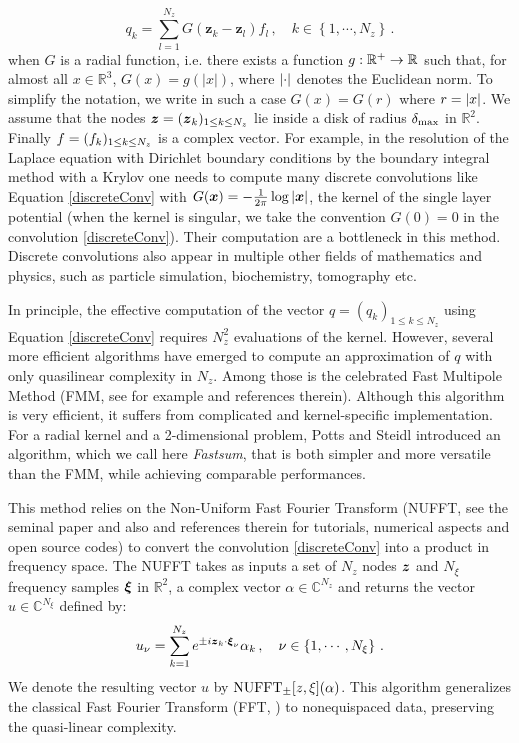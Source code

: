 \documentclass[smallextended]{svjour3}
\begin{document}
\begin{equation}
	q_k = \sum_{l = 1}^{N_z} G(\boldsymbol{z}_k - \boldsymbol{z}_l) f_l\,, \quad k \in \left\{1, \cdots, N_z\right\}\,.
	\label{discreteConv}					
\end{equation}
when $G$ is a radial function, i.e. there exists a function $g : \mathbb{R}^+ \to \mathbb{R}$ such that, for almost all $x \in \mathbb{R}^3$, $G(x) = g(|x|)$, where $\left\lvert \cdot \right\rvert$ denotes the Euclidean norm. To simplify the notation, we write in such a case $G(x) = G(r)$ where $r = \left\lvert x \right\rvert$. We assume that the nodes $\boldsymbol{z} = (\boldsymbol{z}_{k})_{1 \leq k \leq N_z}$ lie inside a disk of radius $\delta_{\max}$ in $\mathbb{R}^2$. Finally $f = (f_{k})_{1 \leq k \leq N_z}$ is a complex vector. For example, in the resolution of the Laplace equation with Dirichlet boundary conditions by the boundary integral method with a Krylov one needs to compute many discrete convolutions like Equation \eqref{discreteConv} with $G(\boldsymbol{x}) = -\frac{1}{2\pi}\log \left\lvert \boldsymbol{x} \right\rvert$, the kernel of the single layer potential (when the kernel is singular, we take the convention $G(0) = 0$ in the convolution \eqref{discreteConv}). Their computation are a bottleneck in this method. Discrete convolutions also appear in multiple other fields of mathematics and physics, such as particle simulation, biochemistry, tomography etc.

In principle, the effective computation of the vector $q = (q_k)_{1 \leq k\leq N_z}$ using Equation \eqref{discreteConv} requires $N_z^2$ evaluations of the kernel. However, several more efficient algorithms have emerged to compute an approximation of $q$ with only quasilinear complexity in $N_z$. Among those is the celebrated Fast Multipole Method (FMM, see for example \cite{greengard1988rapid,rokhlin1990rapid, rokhlin1993diagonal, coifman1993fast, cheng1999fast} and references therein). Although this algorithm is very efficient, it suffers from complicated and kernel-specific implementation. For a radial kernel and a 2-dimensional problem, Potts and Steidl \cite{potts2004fast} introduced an algorithm, which we call here \textit{Fastsum}, that is both simpler and more versatile than the FMM, while achieving comparable performances. 

This method relies on the Non-Uniform Fast Fourier Transform (NUFFT, see the seminal paper \cite{NuFFT} and also \cite{greengard2004accelerating,poplau2006calculation,keiner2009using,potts2001fast} and references therein for tutorials, numerical aspects and open source codes) to convert the convolution \eqref{discreteConv} into a product in frequency space. The NUFFT takes as inputs a set of $N_z$ nodes $\boldsymbol{z}$ and $N_\xi$ frequency samples $\boldsymbol{\xi}$ in $\mathbb{R}^2$, a complex vector $\alpha  \in \mathbb{C}^{N_z}$ and returns the vector  $u \in \mathbb{C}^{N_\xi}$ defined by:
\vspace{-0.1cm}
\[ u_\nu = \sum_{k = 1}^{N_z} e^{\pm i \boldsymbol{z}_k \cdot \boldsymbol{\xi}_\nu} \alpha_k\,, \quad \nu \in \left\{1,\cdots,N_\xi \right\}\,.\]
We denote the resulting vector $u$ by $\textup{NUFFT}_{\pm}[z,\xi](\alpha)$. 
This algorithm generalizes the classical Fast Fourier Transform (FFT,  \cite{cooley1965algorithm}) to nonequispaced data, preserving the quasi-linear complexity.
\end{document}
